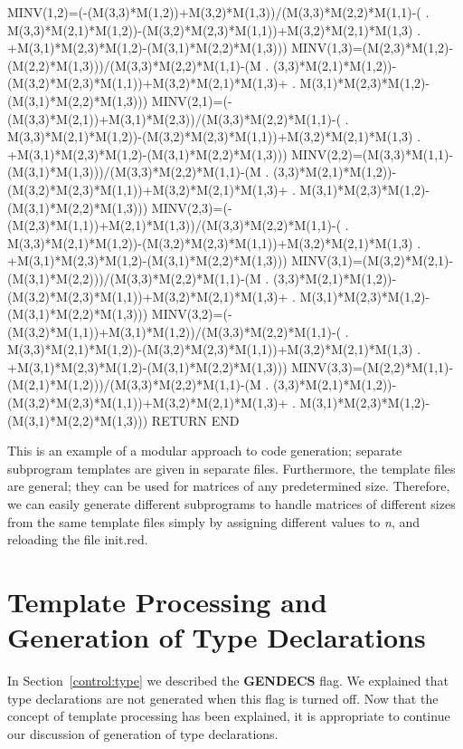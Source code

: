 \begin{framedverbatim}
      MINV(1,2)=(-(M(3,3)*M(1,2))+M(3,2)*M(1,3))/(M(3,3)*M(2,2)*M(1,1)-(
     . M(3,3)*M(2,1)*M(1,2))-(M(3,2)*M(2,3)*M(1,1))+M(3,2)*M(2,1)*M(1,3)
     . +M(3,1)*M(2,3)*M(1,2)-(M(3,1)*M(2,2)*M(1,3)))
      MINV(1,3)=(M(2,3)*M(1,2)-(M(2,2)*M(1,3)))/(M(3,3)*M(2,2)*M(1,1)-(M
     . (3,3)*M(2,1)*M(1,2))-(M(3,2)*M(2,3)*M(1,1))+M(3,2)*M(2,1)*M(1,3)+
     . M(3,1)*M(2,3)*M(1,2)-(M(3,1)*M(2,2)*M(1,3)))
      MINV(2,1)=(-(M(3,3)*M(2,1))+M(3,1)*M(2,3))/(M(3,3)*M(2,2)*M(1,1)-(
     . M(3,3)*M(2,1)*M(1,2))-(M(3,2)*M(2,3)*M(1,1))+M(3,2)*M(2,1)*M(1,3)
     . +M(3,1)*M(2,3)*M(1,2)-(M(3,1)*M(2,2)*M(1,3)))
      MINV(2,2)=(M(3,3)*M(1,1)-(M(3,1)*M(1,3)))/(M(3,3)*M(2,2)*M(1,1)-(M
     . (3,3)*M(2,1)*M(1,2))-(M(3,2)*M(2,3)*M(1,1))+M(3,2)*M(2,1)*M(1,3)+
     . M(3,1)*M(2,3)*M(1,2)-(M(3,1)*M(2,2)*M(1,3)))
      MINV(2,3)=(-(M(2,3)*M(1,1))+M(2,1)*M(1,3))/(M(3,3)*M(2,2)*M(1,1)-(
     . M(3,3)*M(2,1)*M(1,2))-(M(3,2)*M(2,3)*M(1,1))+M(3,2)*M(2,1)*M(1,3)
     . +M(3,1)*M(2,3)*M(1,2)-(M(3,1)*M(2,2)*M(1,3)))
      MINV(3,1)=(M(3,2)*M(2,1)-(M(3,1)*M(2,2)))/(M(3,3)*M(2,2)*M(1,1)-(M
     . (3,3)*M(2,1)*M(1,2))-(M(3,2)*M(2,3)*M(1,1))+M(3,2)*M(2,1)*M(1,3)+
     . M(3,1)*M(2,3)*M(1,2)-(M(3,1)*M(2,2)*M(1,3)))
      MINV(3,2)=(-(M(3,2)*M(1,1))+M(3,1)*M(1,2))/(M(3,3)*M(2,2)*M(1,1)-(
     . M(3,3)*M(2,1)*M(1,2))-(M(3,2)*M(2,3)*M(1,1))+M(3,2)*M(2,1)*M(1,3)
     . +M(3,1)*M(2,3)*M(1,2)-(M(3,1)*M(2,2)*M(1,3)))
      MINV(3,3)=(M(2,2)*M(1,1)-(M(2,1)*M(1,2)))/(M(3,3)*M(2,2)*M(1,1)-(M
     . (3,3)*M(2,1)*M(1,2))-(M(3,2)*M(2,3)*M(1,1))+M(3,2)*M(2,1)*M(1,3)+
     . M(3,1)*M(2,3)*M(1,2)-(M(3,1)*M(2,2)*M(1,3)))
      RETURN                                              
      END                                                 
\end{framedverbatim} 

This is an example of a modular approach to code generation; separate
subprogram templates are given in separate files.  Furthermore, the template
files are general; they can be used for matrices of any predetermined
size.  Therefore, we can easily generate different subprograms to
handle matrices of different sizes from the same template files
simply by assigning different values to {\it n}, and reloading the
file init.red.

\section{Template Processing and Generation of Type Declarations}
\label{template:type}
In Section~\ref{control:type}
we described the {\bf GENDECS} flag.  We explained that
type declarations are not generated when this flag is turned off.  Now that
the concept of template processing has been explained, it is appropriate to
continue our discussion of generation of type declarations.

